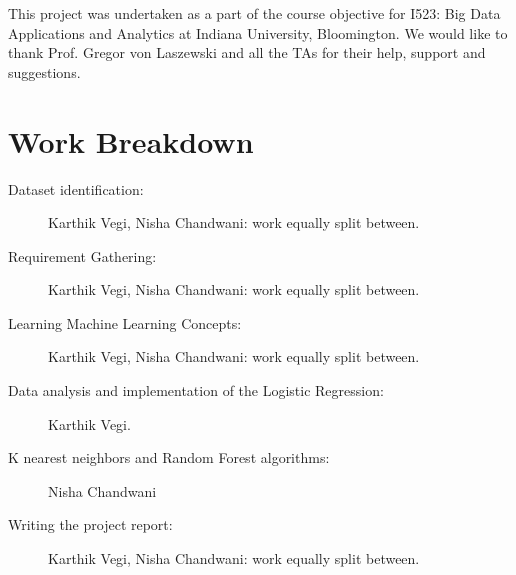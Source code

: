 \documentclass[sigconf]{acmart}
\begin{document}
\begin{acks}
This project was undertaken as a part of the course objective for I523: Big Data Applications and Analytics at Indiana
University, Bloomington. We would like to thank Prof. Gregor
von Laszewski and all the TAs for their help, support and suggestions. 

\end{acks}

\newpage
\appendix 
\section{Work Breakdown} 
\begin{description} 
\item[Dataset identification:] Karthik Vegi, Nisha Chandwani: work equally split between.
\item[Requirement Gathering:] Karthik Vegi, Nisha Chandwani: work equally split between.
\item[Learning Machine Learning Concepts:] Karthik Vegi,  Nisha Chandwani: work equally split between.
\item[Data analysis and implementation of the Logistic Regression:] Karthik Vegi.
\item[K nearest neighbors and Random Forest algorithms:] Nisha Chandwani
\item[Writing the project report:] Karthik Vegi, Nisha Chandwani: work equally split between.
\end{description} 


 
\end{document}
